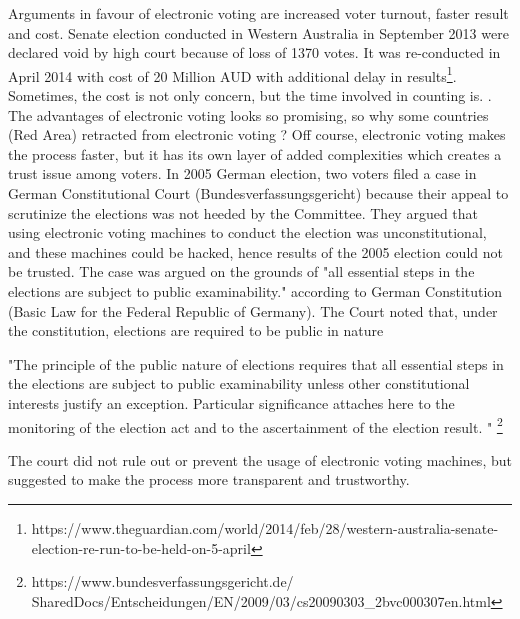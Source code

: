  

   
  Arguments in favour of electronic voting are 
  increased voter turnout, faster result and cost. Senate 
  election conducted in Western Australia in September 2013 were 
  declared void by high court because of loss of 1370 votes. It was 
  re-conducted in April 2014 with cost of 20 Million AUD with additional 
  delay in results\footnote{https://www.theguardian.com/world/2014/feb/28/western-australia-senate-election-re-run-to-be-held-on-5-april}. Sometimes, 
  the cost is not only concern, but the time involved in counting 
  is. . 
  The advantages of electronic voting 
  looks so promising, so why some countries (Red Area) retracted 
  from electronic voting ? Off course, electronic voting makes 
  the process faster, but it has its own layer of added complexities 
  which creates a trust issue among voters. 
  In 2005 German election, two voters filed a case in German 
  Constitutional Court (Bundesverfassungsgericht) because their 
  appeal to scrutinize the elections 
  was not heeded by the Committee. They argued that using electronic 
  voting machines to conduct the election was unconstitutional, and 
  these machines could be hacked, hence results of the 2005 election 
  could not be trusted. The case was argued on the grounds 
  of "all essential steps in the elections are subject to 
  public examinability." according to German Constitution 
  (Basic Law for the Federal Republic of Germany). 
  The Court noted that, under the constitution, elections are 
  required to be public in nature
  
  "The principle of the public nature of elections requires that all 
  essential steps in the elections are subject to public examinability
  unless other constitutional interests justify an exception. 
  Particular significance attaches here to the monitoring of the 
  election act and to the ascertainment of the election result. "
  \footnote{https://www.bundesverfassungsgericht.de/
  SharedDocs/Entscheidungen/EN/2009/03/cs20090303\_2bvc000307en.html}

  The court did not rule out or prevent the usage of electronic 
  voting machines,  but suggested to make the process more 
  transparent and trustworthy.  
  

